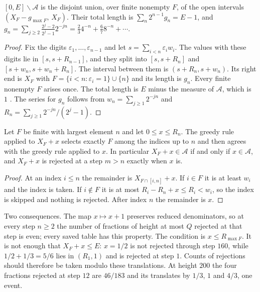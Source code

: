 \documentclass[11pt]{article}
\begin{document}
\begin{lemma}\label{lem:gaps}
$[0,E]\smallsetminus\mathcal A$ is the disjoint union, over finite nonempty $F$, of
the open intervals $(X_F-g_{\max F},\,X_F)$.  Their total length is
$\sum_n2^{n-1}g_n=E-1$, and
$g_n=\sum_{j\ge2}\frac{2^j-2}{2^j-1}2^{-jn}=\tfrac23 4^{-n}+\tfrac67 8^{-n}+\cdots$.
\end{lemma}

\begin{proof}
Fix the digits $\varepsilon_1,\dots,\varepsilon_{n-1}$ and let
$s=\sum_{i<n}\varepsilon_iw_i$.
The values with these digits lie in $[s,s+R_{n-1}]$, and they split into
$[s,s+R_n]$ and $[s+w_n,s+w_n+R_n]$.  The interval between them is
$(s+R_n,s+w_n)$.  Its right end is $X_F$ with
$F=\{i<n:\varepsilon_i=1\}\cup\{n\}$ and its length is $g_n$.  Every finite
nonempty $F$ arises once.  The total length is $E$ minus the measure of
$\mathcal A$, which is $1$ \cite[Section~7]{plectis257}.  The series for $g_n$
follows from $w_n=\sum_{j\ge1}2^{-jn}$ and
$R_n=\sum_{j\ge1}2^{-jn}/(2^j-1)$.
\end{proof}

\begin{lemma}\label{lem:translate}
Let $F$ be finite with largest element $n$ and let $0\le x\le R_n$.  The greedy
rule applied to $X_F+x$ selects exactly $F$ among the indices up to $n$ and then
agrees with the greedy rule applied to $x$.  In particular $X_F+x\in\mathcal A$
if and only if $x\in\mathcal A$, and $X_F+x$ is rejected at a step $m>n$ exactly
when $x$ is.
\end{lemma}

\begin{proof}
At an index $i\le n$ the remainder is $X_{F\cap[i,n]}+x$.  If $i\in F$ it is at
least $w_i$ and the index is taken.  If $i\notin F$ it is at most
$R_i-R_n+x\le R_i<w_i$, so the index is skipped and nothing is rejected.  After
index $n$ the remainder is $x$.
\end{proof}

Two consequences.  The map $x\mapsto x+1$ preserves reduced denominators, so at
every step $n\ge2$ the number of fractions of height at most $Q$ rejected at
that step is even; every saved table has this property.  The condition is
$x\le R_{\max F}$.  It is not enough that $X_F+x\le E$: $x=1/2$ is not rejected
through step $160$, while $1/2+1/3=5/6$ lies in $(R_1,1)$ and is rejected at
step $1$.  Counts of rejections should therefore be taken modulo these
translations.  At height $200$ the four fractions rejected at step $12$ are
$46/183$ and its translates by $1/3$, $1$ and $4/3$, one event.
\end{document}

